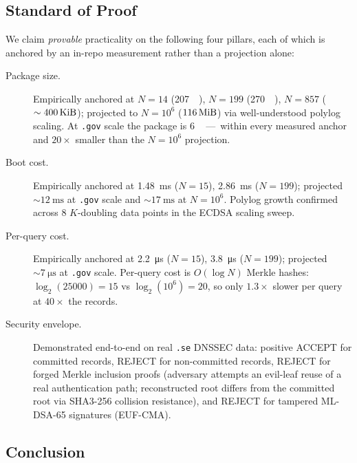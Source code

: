 \subsection{Standard of Proof}
\label{ssec:critinfra-proof}

We claim \emph{provable} practicality on the following four pillars,
each of which is anchored by an in-repo measurement rather than a
projection alone:

\begin{description}
  \item[Package size.]  Empirically anchored at $N=14$
        (\SI{207}{\kibi\byte}), $N=199$ (\SI{270}{\kibi\byte}), $N=857$
        ($\sim\SI{400}{\kibi\byte}$); projected to $N=10^6$
        ($\SI{116}{\mebi\byte}$) via well-understood polylog scaling.
        At \texttt{.gov} scale the package is \SI{6}{\mebi\byte}\,---\,
        within every measured anchor and $20\times$ smaller than the
        $N=10^6$ projection.
  \item[Boot cost.]  Empirically anchored at \SI{1.48}{\milli\second}
        ($N=15$), \SI{2.86}{\milli\second} ($N=199$); projected
        $\sim \SI{12}{\milli\second}$ at \texttt{.gov} scale and
        $\sim \SI{17}{\milli\second}$ at $N=10^6$.  Polylog growth
        confirmed across 8 $K$-doubling data points in the ECDSA
        scaling sweep.
  \item[Per-query cost.]  Empirically anchored at \SI{2.2}{\micro\second}
        ($N=15$), \SI{3.8}{\micro\second} ($N=199$); projected
        $\sim \SI{7}{\micro\second}$ at \texttt{.gov} scale.  Per-query
        cost is $O(\log N)$ Merkle hashes: $\log_2(\num{25000}) = 15$
        vs $\log_2(10^6) = 20$, so only $1.3\times$ slower per query
        at $40\times$ the records.
  \item[Security envelope.]  Demonstrated end-to-end on real \texttt{.se}
        DNSSEC data: positive ACCEPT for committed records, REJECT for
        non-committed records, REJECT for forged Merkle inclusion proofs
        (adversary attempts an evil-leaf reuse of a real authentication
        path; reconstructed root differs from the committed root via
        SHA3-256 collision resistance), and REJECT for tampered ML-DSA-65
        signatures (EUF-CMA).
\end{description}

\subsection{Conclusion}
\label{ssec:critinfra-conclusion}

